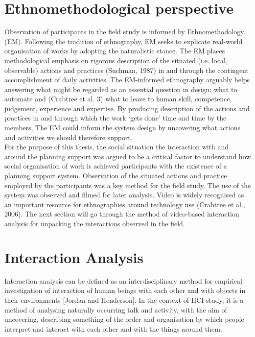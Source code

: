 \section{Ethnomethodological perspective}
Observation of participants in the field study is informed by Ethnomethodology (EM). Following the tradition of ethnography, EM seeks to explicate real-world organisation of works by adopting the naturalistic stance. The EM places methodological emphasis on rigorous description of the situated (i.e. local, observable) actions and practices (Suchman, 1987) in and through the contingent accomplishment of daily activities. The EM-informed ethnography arguably helps answering what might be regarded as an essential question in design: what to automate and (Crabtree et al. 3) what to leave to human skill, competence, judgement, experience and expertise. By producing description of the actions and practices in and through which the work `gets done' time and time by the members, The EM could inform the system design by uncovering what actions and activities we should therefore support.\\

For the purpose of this thesis, the social situation the interaction with and around the planning support was argued to be a critical factor to understand how social organisation of work is achieved participants with the existence of a planning support system. Observation of the situated actions and practice employed by the participants was a key method for the field study. The use of the system was observed and filmed for later analysis. Video is widely recognised as an important resource for ethnographies around technology use (Crabtree et al., 2006). The next section will go through the method of video-based interaction analysis for unpacking the interactions observed in the field. \\

\section{Interaction Analysis}
Interaction analysis can be defined as an interdisciplinary method for empirical investigation of interaction of human beings with each other and with objects in their environments [Jordan and Henderson]. In the context of HCI study, it is a method of analysing naturally occurring talk and activity, with the aim of uncovering, describing something of the order and organisation by which people interpret and interact with each other and with the things around them.\\

